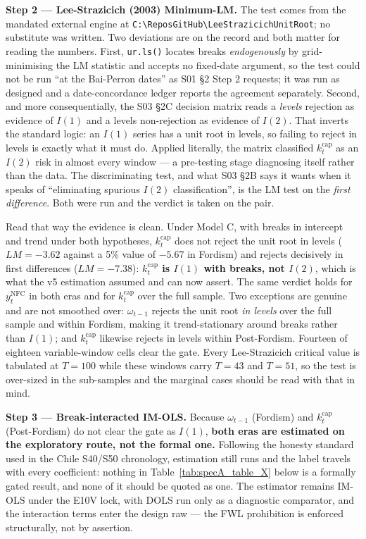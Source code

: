 \documentclass[11pt,a4paper]{article}
\begin{document}
\noindent\textbf{Step 2 --- Lee-Strazicich (2003) Minimum-LM.} The test comes from the mandated external engine at \texttt{C:\textbackslash ReposGitHub\textbackslash LeeStrazicichUnitRoot}; no substitute was written. Two deviations are on the record and both matter for reading the numbers. First, \texttt{ur.ls()} locates breaks \textit{endogenously} by grid-minimising the LM statistic and accepts no fixed-date argument, so the test could not be run ``at the Bai-Perron dates'' as S01 \S2 Step 2 requests; it was run as designed and a date-concordance ledger reports the agreement separately. Second, and more consequentially, the S03 \S2C decision matrix reads a \textit{levels} rejection as evidence of $I(1)$ and a levels non-rejection as evidence of $I(2)$. That inverts the standard logic: an $I(1)$ series has a unit root in levels, so failing to reject in levels is exactly what it must do. Applied literally, the matrix classified $k_t^{\text{cap}}$ as an $I(2)$ risk in almost every window --- a pre-testing stage diagnosing itself rather than the data. The discriminating test, and what S03 \S2B says it wants when it speaks of ``eliminating spurious $I(2)$ classification'', is the LM test on the \textit{first difference}. Both were run and the verdict is taken on the pair.

Read that way the evidence is clean. Under Model C, with breaks in intercept and trend under both hypotheses, $k_t^{\text{cap}}$ does not reject the unit root in levels ($LM = -3.62$ against a 5\% value of $-5.67$ in Fordism) and rejects decisively in first differences ($LM = -7.38$): \textbf{$k_t^{\text{cap}}$ is $I(1)$ with breaks, not $I(2)$}, which is what the v5 estimation assumed and can now assert. The same verdict holds for $y_t^{\text{NFC}}$ in both eras and for $k_t^{\text{cap}}$ over the full sample. Two exceptions are genuine and are not smoothed over: $\omega_{t-1}$ rejects the unit root \textit{in levels} over the full sample and within Fordism, making it trend-stationary around breaks rather than $I(1)$; and $k_t^{\text{cap}}$ likewise rejects in levels within Post-Fordism. Fourteen of eighteen variable-window cells clear the gate. Every Lee-Strazicich critical value is tabulated at $T = 100$ while these windows carry $T = 43$ and $T = 51$, so the test is over-sized in the sub-samples and the marginal cases should be read with that in mind.

\noindent\textbf{Step 3 --- Break-interacted IM-OLS.} Because $\omega_{t-1}$ (Fordism) and $k_t^{\text{cap}}$ (Post-Fordism) do not clear the gate as $I(1)$, \textbf{both eras are estimated on the exploratory route, not the formal one.} Following the honesty standard used in the Chile S40/S50 chronology, estimation still runs and the label travels with every coefficient: nothing in Table~\ref{tab:specA_table_X} below is a formally gated result, and none of it should be quoted as one. The estimator remains IM-OLS under the E10V lock, with DOLS run only as a diagnostic comparator, and the interaction terms enter the design raw --- the FWL prohibition is enforced structurally, not by assertion.
\end{document}
